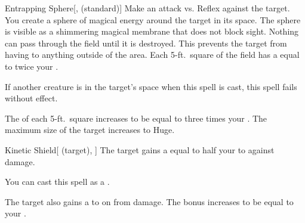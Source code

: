 \lowercase{\hypertarget{spell:Entrapping Sphere}{}}\label{spell:Entrapping Sphere}
\begin{freeability}[Rank 4]{\hypertarget{spell:Entrapping Sphere}{Entrapping Sphere}}[,  (standard)]
Make an attack vs. Reflex against the target.
\hit You create a sphere of magical energy around the target in its space.
The sphere is visible as a shimmering magical membrane that does not block sight.
Nothing can pass through the field until it is destroyed.
This prevents the target from having  to anything outside of the area.
Each 5-ft.\ square of the field has a  equal to twice your .

If another creature is in the target's space when this spell is cast, this spell fails without effect.

\rankline
{} The  of each 5-ft.\ square increases to be equal to three times your .
 The maximum size of the target increases to Huge.
\end{freeability}
\vspace{0.25em}



\lowercase{\hypertarget{spell:Kinetic Shield}{}}\label{spell:Kinetic Shield}
\begin{attuneability}[Rank 4]{\hypertarget{spell:Kinetic Shield}{Kinetic Shield}}[ (target), ]
The target gains a  equal to half your  to  against  damage.

You can cast this spell as a .

\rankline
{} The target also gains a   to  on  from  damage.
 The bonus increases to be equal to your .
\end{attuneability}
\vspace{0.25em}



